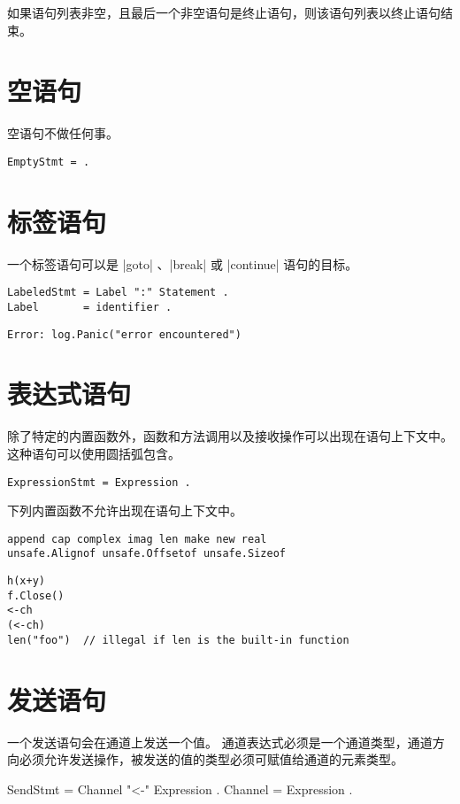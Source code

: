 如果语句列表非空，且最后一个非空语句是终止语句，则该语句列表以终止语句结束。

\section{空语句}
空语句不做任何事。
\begin{lstlisting}[style=EBNF, language=EBNF]
EmptyStmt = .
\end{lstlisting}

\section{标签语句}
一个标签语句可以是 \code|goto| 、\code|break| 或 \code|continue| 语句的目标。
\begin{lstlisting}[style=EBNF, language=EBNF]
LabeledStmt = Label ":" Statement .
Label       = identifier .
\end{lstlisting}

\begin{lstlisting}[language=golang, style=golang]
Error: log.Panic("error encountered")
\end{lstlisting}

\section{表达式语句}
除了特定的内置函数外，函数和方法调用以及接收操作可以出现在语句上下文中。这种语句可以使用圆括弧包含。
\begin{lstlisting}[style=EBNF, language=EBNF]
ExpressionStmt = Expression .
\end{lstlisting}

下列内置函数不允许出现在语句上下文中。
\begin{lstlisting}[style=golang, language=golang]
append cap complex imag len make new real
unsafe.Alignof unsafe.Offsetof unsafe.Sizeof
\end{lstlisting}
\begin{lstlisting}[style=golang, language=golang]
h(x+y)
f.Close()
<-ch
(<-ch)
len("foo")  // illegal if len is the built-in function
\end{lstlisting}

\section{发送语句}
一个发送语句会在通道上发送一个值。
通道表达式必须是一个通道类型，通道方向必须允许发送操作，被发送的值的类型必须可赋值给通道的元素类型。
\begin{EBNF}
SendStmt = Channel "<-" Expression .
Channel  = Expression .
\end{EBNF}

